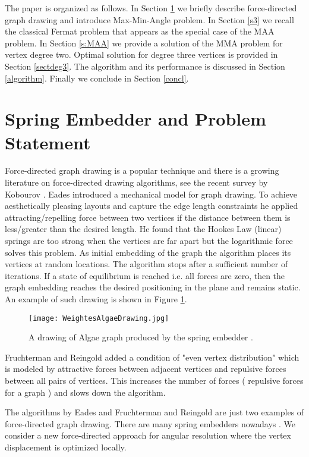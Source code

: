 \documentclass[10pt]{article}
\begin{document}
The paper is organized as follows.
In Section \ref{s2} we briefly describe force-directed graph drawing and introduce Max-Min-Angle problem. In Section \ref{s3} we recall the classical Fermat problem that appears as the special case of the MAA problem. In Section \ref{s:MAA} we provide a solution of the MMA problem for vertex degree two. 
Optimal solution for degree three vertices is provided in Section \ref{sectdeg3}. 
The algorithm and its performance is discussed in Section \ref{algorithm}.
Finally we conclude in Section \ref{concl}.


\section{Spring Embedder and Problem Statement} \label{s2}

Force-directed graph drawing is a popular technique and there is a growing literature on 
force-directed drawing algorithms, see the recent survey by Kobourov \cite{k-fdda-12}.
Eades \cite{EA84} introduced a mechanical model for graph drawing. 
To achieve aesthetically pleasing layouts and capture the edge length constraints he applied 
attracting/repelling force between two vertices if the distance between them is less/greater than the desired length. He found that the Hookes Law (linear) springs 
are too strong when the vertices are far apart but the logarithmic force solves this problem.
As initial embedding of the graph the algorithm places its vertices at random locations. 
The algorithm stops after a sufficient number of iterations. 
If a state of equilibrium is reached i.e. all forces are zero, then the graph embedding reaches 
the desired positioning in the plane and remains static. An example of such drawing is shown in Figure \ref{fig:algae}.

\begin{figure}[htp]
\centering
\texttt{[image: WeightesAlgaeDrawing.jpg]}
\caption{A drawing of Algae graph \cite{pb-opn-12} produced by the spring embedder \cite{embedder}.}
\label{fig:algae}
\end{figure}

Fruchterman and Reingold \cite{ft91} added a condition of "even vertex distribution" which is modeled  by attractive forces between adjacent vertices and repulsive forces between all pairs of vertices. This increases the number of forces ( repulsive forces for a graph ) and slows down the algorithm.

The algorithms by Eades  \cite{EA84} and Fruchterman and Reingold \cite{ft91} are just two examples of force-directed graph drawing. There are many spring embedders nowadays \cite{k-fdda-12}. 
We consider a new force-directed approach for angular resolution where the vertex displacement is optimized locally. 
\end{document}
